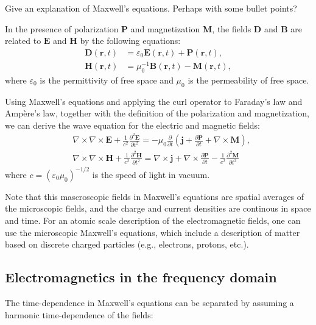 Give an explanation of Maxwell's equations. Perhaps with some bullet points?

In the presence of polarization $\mathbf{P}$ and magnetization $\mathbf{M}$, 
the fields $\mathbf{D}$ and $\mathbf{B}$ are related to $\mathbf{E}$ and 
$\mathbf{H}$ by the following equations:
\begin{align}
    \mathbf{D}(\mathbf{r}, t) &= \varepsilon_0 \mathbf{E}(\mathbf{r}, t) + \mathbf{P}(\mathbf{r}, t), \\
    \mathbf{H}(\mathbf{r}, t) &= \mu_0^{-1} \mathbf{B}(\mathbf{r}, t) - \mathbf{M}(\mathbf{r}, t),
\end{align}
where $\varepsilon_0$ is the permittivity of free space and $\mu_0$ is the permeability of free space.

Using Maxwell's equations and applying the curl operator to Faraday's law and Ampère's law, 
together with the definition of the polarization and magnetization,
we can derive the wave equation for the electric and magnetic fields:
\begin{equation}
\begin{aligned}
    & \nabla \times \nabla \times \mathbf{E}+\frac{1}{c^2} \frac{\partial^2 \mathbf{E}}{\partial t^2}=-\mu_0 \frac{\partial}{\partial t}\left(\mathbf{j}+\frac{\partial \mathbf{P}}{\partial t}+\nabla \times \mathbf{M}\right), \\
    & \nabla \times \nabla \times \mathbf{H}+\frac{1}{c^2} \frac{\partial^2 \mathbf{H}}{\partial t^2}=\nabla \times \mathbf{j}+\nabla \times \frac{\partial \mathbf{P}}{\partial t}-\frac{1}{c^2} \frac{\partial^2 \mathbf{M}}{\partial t^2}
\end{aligned}
\end{equation}
where $c=(\varepsilon_0 \mu_0)^{-1/2}$ is the speed of light in vacuum.

Note that this mascroscopic fields in Maxwell's equations are spatial averages of the
microscopic fields, and the charge and current densities are continous in space and time.
For an atomic scale description of the electromagnetic fields, one can use the microscopic
Maxwell's equations, which include a description of matter based on discrete charged particles
(e.g., electrons, protons, etc.).

\subsection*{Electromagnetics in the frequency domain}

The time-dependence in Maxwell's equations can be separated by assuming a harmonic time-dependence of the fields:

